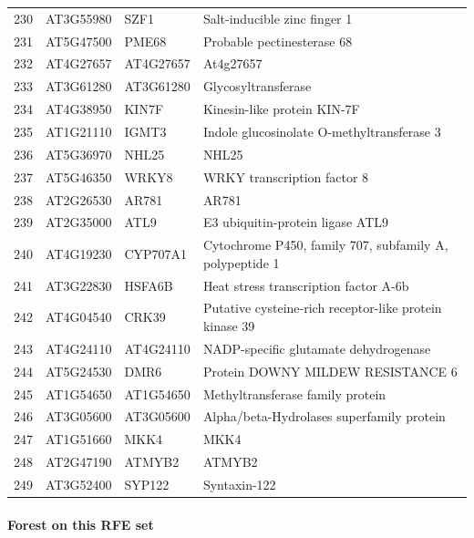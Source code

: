 \documentclass[11pt]{article}
\begin{document}
\begin{center}
\begin{tabular}{rlll}
230 & AT3G55980 & SZF1 & Salt-inducible zinc finger 1\\
231 & AT5G47500 & PME68 & Probable pectinesterase 68\\
232 & AT4G27657 & AT4G27657 & At4g27657\\
233 & AT3G61280 & AT3G61280 & Glycosyltransferase\\
234 & AT4G38950 & KIN7F & Kinesin-like protein KIN-7F\\
235 & AT1G21110 & IGMT3 & Indole glucosinolate O-methyltransferase 3\\
236 & AT5G36970 & NHL25 & NHL25\\
237 & AT5G46350 & WRKY8 & WRKY transcription factor 8\\
238 & AT2G26530 & AR781 & AR781\\
239 & AT2G35000 & ATL9 & E3 ubiquitin-protein ligase ATL9\\
240 & AT4G19230 & CYP707A1 & Cytochrome P450, family 707, subfamily A, polypeptide 1\\
241 & AT3G22830 & HSFA6B & Heat stress transcription factor A-6b\\
242 & AT4G04540 & CRK39 & Putative cysteine-rich receptor-like protein kinase 39\\
243 & AT4G24110 & AT4G24110 & NADP-specific glutamate dehydrogenase\\
244 & AT5G24530 & DMR6 & Protein DOWNY MILDEW RESISTANCE 6\\
245 & AT1G54650 & AT1G54650 & Methyltransferase family protein\\
246 & AT3G05600 & AT3G05600 & Alpha/beta-Hydrolases superfamily protein\\
247 & AT1G51660 & MKK4 & MKK4\\
248 & AT2G47190 & ATMYB2 & ATMYB2\\
249 & AT3G52400 & SYP122 & Syntaxin-122\\
\end{tabular}
\end{center}


\paragraph{Forest on this RFE set}
\label{sec:orgf977315}
\end{document}
